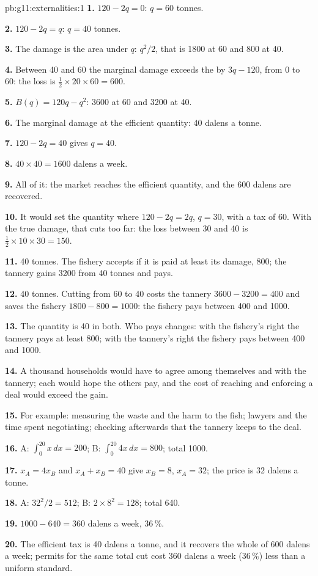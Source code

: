 \begin{solution}{pb:g11:externalities:1}
\textbf{1.} $120 - 2q = 0$: $q = 60$ tonnes.

\textbf{2.} $120 - 2q = q$: $q = 40$ tonnes.

\textbf{3.} The damage is the area under $q$: $q^2/2$, that is 1800 at 60 and 800 at 40.

\textbf{4.} Between 40 and 60 the marginal damage exceeds the  by $3q - 120$, from 0 to 60: the loss is $\tfrac12 \times 20 \times 60 = 600$.

\textbf{5.} $B(q) = 120q - q^2$: 3600 at 60 and 3200 at 40.

\textbf{6.} The marginal damage at the efficient quantity: 40 dalens a tonne.

\textbf{7.} $120 - 2q = 40$ gives $q = 40$.

\textbf{8.} $40 \times 40 = 1600$ dalens a week.

\textbf{9.} All of it: the market reaches the efficient quantity, and the 600 dalens are recovered.

\textbf{10.} It would set the quantity where $120 - 2q = 2q$, $q = 30$, with a tax of 60. With the true damage, that cuts too far: the loss between 30 and 40 is $\tfrac12 \times 10
\times 30 = 150$.

\textbf{11.} 40 tonnes. The fishery accepts if it is paid at least its damage, 800; the tannery gains 3200 from 40 tonnes and pays.

\textbf{12.} 40 tonnes. Cutting from 60 to 40 costs the tannery $3600 - 3200 = 400$ and saves the fishery $1800 - 800 = 1000$: the fishery pays between 400 and 1000.

\textbf{13.} The quantity is 40 in both. Who pays changes: with the fishery's right the tannery pays at least 800; with the tannery's right the fishery pays between 400 and 1000.

\textbf{14.} A thousand households would have to agree among themselves and with the tannery; each would hope the others pay, and the cost of reaching and enforcing a deal
would exceed the gain.

\textbf{15.} For example: measuring the waste and the harm to the fish; lawyers and the time spent negotiating; checking afterwards that the tannery keeps to the deal.

\textbf{16.} A: $\int_0^{20} x\,dx = 200$; B: $\int_0^{20} 4x\,dx = 800$; total 1000.

\textbf{17.} $x_A = 4x_B$ and $x_A + x_B = 40$ give $x_B = 8$, $x_A = 32$; the price is 32 dalens a tonne.

\textbf{18.} A: $32^2/2 = 512$; B: $2 \times 8^2 = 128$; total 640.

\textbf{19.} $1000 - 640 = 360$ dalens a week, 36\,\%.

\textbf{20.} The efficient tax is 40 dalens a tonne, and it recovers the whole  of 600 dalens a week; permits for the same total cut cost 360 dalens a week (36\,\%) less
than a uniform standard.
\end{solution}
